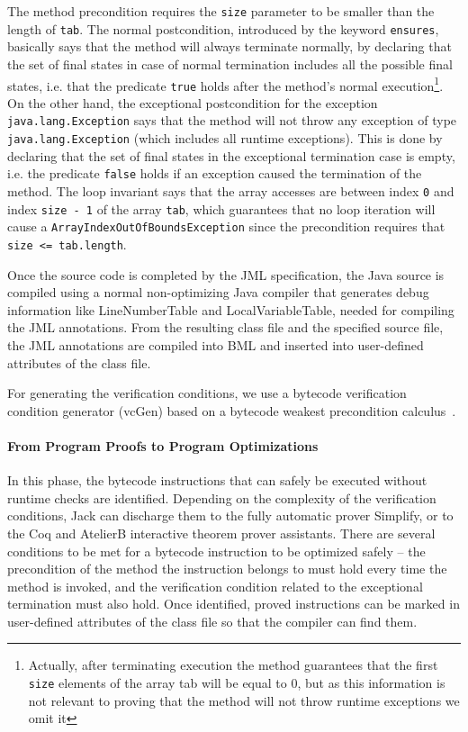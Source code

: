 The method precondition requires the \verb!size! parameter to be smaller than the length of \verb!tab!. The normal postcondition, introduced by the keyword \verb!ensures!, basically says that the method will always terminate normally, by declaring that the set of final states in case of normal termination includes all the possible final states, i.e. that the predicate \verb!true! holds after the method's normal execution\footnote{Actually, after terminating execution the method guarantees that the first \texttt{size} elements of the array tab will be equal to 0, but as this information is not relevant to proving that the method will not throw runtime exceptions we omit it}. On the other hand, the exceptional postcondition for the exception \texttt{java.lang.Exception} says that the method will not throw any exception of type \texttt{java.lang.Exception} (which includes all runtime exceptions). This is done by declaring that the set of final states in the exceptional termination case is empty, i.e. the predicate \texttt{false} holds if an exception caused the termination of the method. The loop invariant says that the array accesses are between index \verb!0! and index \verb!size - 1! of the array \verb!tab!, which guarantees that no loop iteration will cause a \verb!ArrayIndexOutOfBoundsException! since the precondition requires that \verb!size <= tab.length!.

Once the source code is completed by the JML specification, the Java source is compiled using a normal non-optimizing Java compiler that generates debug information like \textrm{LineNumberTable} and \textrm{LocalVariableTable}, needed for compiling the JML annotations. From the resulting class file and the specified source file, the JML annotations are compiled into BML and inserted into user-defined attributes of the class file. 

For generating the verification conditions, we use a bytecode verification condition generator (vcGen) based on a bytecode weakest precondition calculus~\cite{JBL05MP}. 

\paragraph{From Program Proofs to Program Optimizations }
\label{proofs}
In this phase, the bytecode instructions that can safely be executed without runtime checks are identified. Depending on the complexity of the verification conditions, Jack can discharge them to the fully automatic prover Simplify, or to the Coq and AtelierB interactive theorem prover assistants.
There are several conditions to be met for a bytecode instruction to be optimized safely -- the precondition of the method the instruction belongs to must hold every time the method is invoked, and the verification condition related to the exceptional termination must also hold.
Once identified, proved instructions can be marked in user-defined attributes of the class file so that the compiler can find them.

